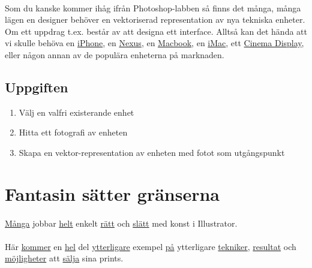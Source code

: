 \documentclass{article}
\begin{document}
    \paragraph{}
    Som du kanske kommer ihåg ifrån Photoshop-labben så finns det många, många lägen en designer behöver en vektoriserad representation av nya tekniska enheter. Om ett uppdrag t.ex. består av att designa ett interface. Alltså kan det hända att vi skulle behöva en
    \href{http://dribbble.com/shots/969976-Sketched-Minimus}{iPhone}, en
    \href{http://dribbble.com/shots/931519-Nexus-4-Vector-Mockup}{Nexus}, en
    \href{http://dribbble.com/shots/1143675-Flat-Macbook-Pro-Freebie}{Macbook}, en
    \href{http://dribbble.com/shots/971338-iMac-youMac-he-sheMac}{iMac}, ett
    \href{http://www.pinterest.com/pin/536350636843223522}{Cinema Display}, eller någon annan av de populära enheterna på marknaden.

    \subsection*{ Uppgiften }
      \begin{enumerate}
        \item Välj en valfri existerande enhet
        \item Hitta ett fotografi av enheten
        \item Skapa en vektor-representation av enheten med fotot som utgångspunkt
      \end{enumerate}


     
  \newpage
  \section{ Fantasin sätter gränserna }
    \paragraph{}
    \href{http://www.behance.net/gallery/Prints-2012/3565675}{Många}
    jobbar
    \href{http://mattlyon.tumblr.com/}{helt}
    enkelt
    \href{http://www.pinterest.com/pin/433260426621559006/}{rätt}
    och
    \href{http://www.pinterest.com/source/c8six.com/}{slätt}
    med konst i Illustrator.

    \paragraph{}
    Här
    \href{http://www.pinterest.com/pin/183451384791435134/}{kommer}
    en
    \href{http://society6.com/product/Forest-Pastel-Rzc_Print}{hel}
    del
    \href{http://society6.com/product/Miami-vVL_Print}{ytterligare}
    exempel
    \href{http://society6.com/product/Balloon-ylb_Print}{på}
    ytterligare
    \href{http://society6.com/product/Boston-chI_Print}{tekniker},
    \href{http://society6.com/product/Colorful-Rectangles_Print}{resultat}
    och
    \href{http://society6.com/product/The-end-of-the-rainbow-POk_Print}{möjligheter}
    att
    \href{http://society6.com/product/Here-comes-the-sun-e7D_Print}{sälja}
    sina prints.
\end{document}
